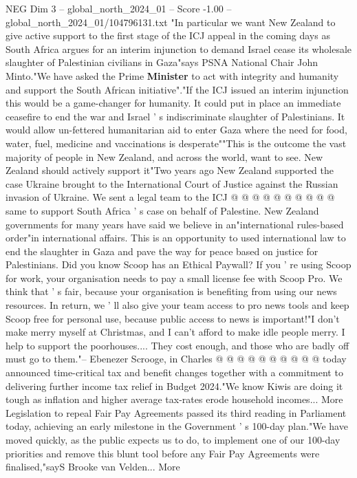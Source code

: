 \begin{textsample}{NEG Dim 3 – global\_north\_2024\_01 – Score -1.00 – global\_north\_2024\_01/104796131.txt}  \label{ex:f3_neg_220}
"In particular we want New Zealand to give active support to the first stage of the ICJ appeal in the coming days as South Africa argues for an interim injunction to demand Israel cease its wholesale slaughter of Palestinian civilians in Gaza"says PSNA National Chair John Minto."We have asked the Prime \textbf{Minister} to act with integrity and humanity and support the South African initiative"."If the ICJ issued an interim injunction this would be a game-changer for humanity.
It could put in place an immediate ceasefire to end the war and Israel ' s indiscriminate slaughter of Palestinians.
It would allow un-fettered humanitarian aid to enter Gaza where the need for food, water, fuel, medicine and vaccinations is desperate""This is the outcome the vast majority of people in New Zealand, and across the world, want to see.
New Zealand should actively support it"Two years ago New Zealand supported the case Ukraine brought to the International Court of Justice against the Russian invasion of Ukraine.
We sent a legal team to the ICJ @ @ @ @ @ @ @ @ @ @ same to support South Africa ' s case on behalf of Palestine.
New Zealand governments for many years have said we believe in an"international rules-based order"in international affairs.
This is an opportunity to used international law to end the slaughter in Gaza and pave the way for peace based on justice for Palestinians.
Did you know Scoop has an Ethical Paywall?
If you ' re using Scoop for work, your organisation needs to pay a small license fee with Scoop Pro.
We think that ' s fair, because your organisation is benefiting from using our news resources.
In return, we ' ll also give your team access to pro news tools and keep Scoop free for personal use, because public access to news is important!"I don't make merry myself at Christmas, and I can't afford to make idle people merry.
I help to support the poorhouses....
They cost enough, and those who are badly off must go to them."-- Ebenezer Scrooge, in Charles @ @ @ @ @ @ @ @ @ @ today announced time-critical tax and benefit changes together with a commitment to delivering further income tax relief in Budget 2024."We know Kiwis are doing it tough as inflation and higher average tax-rates erode household incomes...
More Legislation to repeal Fair Pay Agreements passed its third reading in Parliament today, achieving an early milestone in the Government ' s 100-day plan."We have moved quickly, as the public expects us to do, to implement one of our 100-day priorities and remove this blunt tool before any Fair Pay Agreements were finalised,"sayS Brooke van Velden...
More

\end{textsample}
